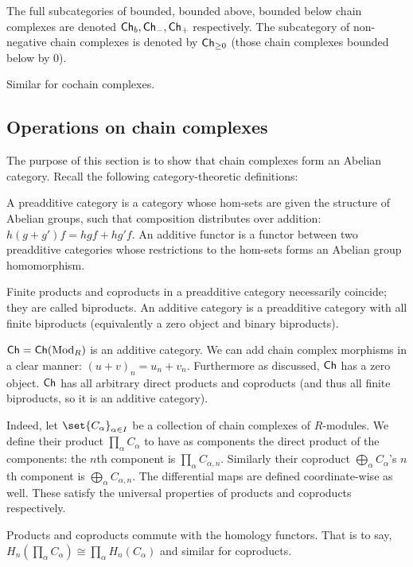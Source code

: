     The full subcategories of bounded, bounded above, bounded below chain complexes are denoted ${\sf Ch}_b,{\sf Ch}_-,{\sf Ch}_+$ respectively.
    The subcategory of non-negative chain complexes is denoted by ${\sf Ch}_{\geq0}$ (those chain complexes bounded below by $0$).

    Similar for cochain complexes.

\edefn

\subsection{Operations on chain complexes}

The purpose of this section is to show that chain complexes form an {\emphcolor Abelian category}.
Recall the following category-theoretic definitions:

\bdefn

    A {\emphcolor preadditive category} is a category whose hom-sets are given the structure of Abelian groups, such that composition distributes over addition: $h(g+g')f=hgf+hg'f$.
    An {\emphcolor additive functor} is a functor between two preadditive categories whose restrictions to the hom-sets forms an Abelian group homomorphism.

    Finite products and coproducts in a preadditive category necessarily coincide; they are called {\emphcolor biproducts}.
    An {\emphcolor additive category} is a preadditive category with all finite biproducts (equivalently a zero object and binary biproducts).

\edefn

${\sf Ch}={\sf Ch}({\rm Mod}_R)$ is an additive category.
We can add chain complex morphisms in a clear manner: $(u+v)_n=u_n+v_n$.
Furthermore as discussed, ${\sf Ch}$ has a zero object.
${\sf Ch}$ has all arbitrary direct products and coproducts (and thus all finite biproducts, so it is an additive category).

Indeed, let $\set{C_\alpha}_{\alpha\in I}$ be a collection of chain complexes of $R$-modules.
We define their product $\prod_\alpha C_\alpha$ to have as components the direct product of the components: the $n$th component is $\prod_\alpha C_{\alpha,n}$.
Similarly their coproduct $\bigoplus_\alpha C_\alpha$'s $n$th component is $\bigoplus_\alpha C_{\alpha,n}$.
The differential maps are defined coordinate-wise as well.
These satisfy the universal properties of products and coproducts respectively.

\bprop

    Products and coproducts commute with the homology functors.
    That is to say, $H_n(\prod_\alpha C_\alpha)\cong\prod_\alpha H_n(C_\alpha)$ and similar for coproducts.

